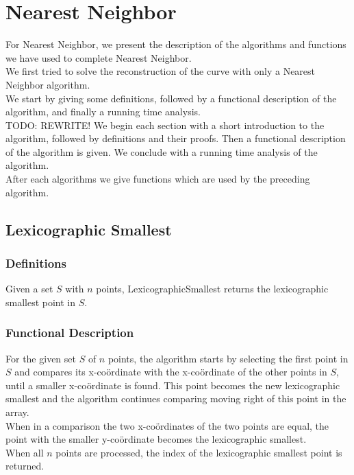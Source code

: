 \chapter{Nearest Neighbor}
\label{cha:nearest_neighbor}

For Nearest Neighbor, we present the description of the algorithms and functions we have used to complete Nearest Neighbor.\\
We first tried to solve the reconstruction of the curve with only a Nearest Neighbor algorithm.\\
We start by giving some definitions, followed by a functional description of the algorithm, and finally a running time analysis. \\
TODO: REWRITE! We begin each section with a short introduction to the algorithm, followed by definitions and their proofs. Then a functional description of the algorithm is given. We conclude with a running time analysis of the algorithm.\\
After each algorithms we give functions which are used by the preceding algorithm.\\

  \section{Lexicographic Smallest}
  \label{sec:lexicographic_smallest}

    \subsection{Definitions}
    \label{sub:definitions}
      \begin{definition} \label{def:ls}
          Given a set $S$ with $n$ points, LexicographicSmallest returns the lexicographic smallest point in $S$.
      \end{definition}


    \subsection{Functional Description}
    \label{sub:functional_description}
      For the given set $S$ of $n$ points, the algorithm starts by selecting the first point in $S$ and compares its x-co\"ordinate with the x-co\"ordinate of the other points in $S$, until a smaller x-co\"ordinate is found. This point becomes the new lexicographic smallest and the algorithm continues comparing moving right of this point in the array.\\
      When in a comparison the two x-co\"ordinates of the two points are equal, the point with the smaller y-co\"ordinate becomes the lexicographic smallest.\\
      When all $n$ points are processed, the index of the lexicographic smallest point is returned.

